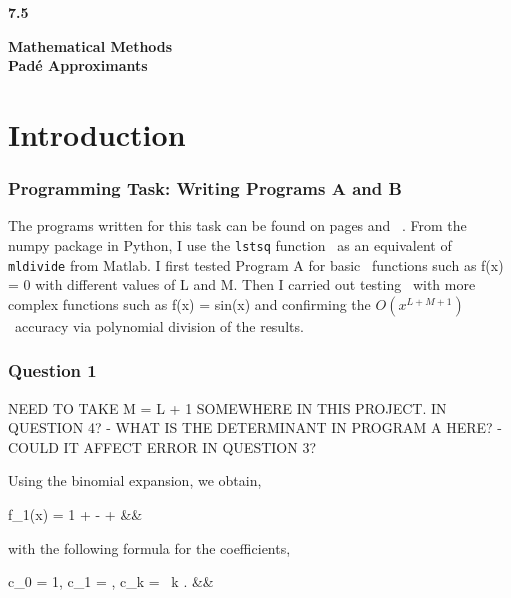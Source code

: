 \documentclass[12pt, a4paper]{article}
\begin{document}
	
	\setlength{\parindent}{0pt}
	\captionsetup{justification=centering}
	\lstset{
		showstringspaces=false
	}
	
	
	\begin{titlepage}
		\LARGE
		\textbf{7.5}
		\begin{center}
			\vspace*{7cm}
			
			\LARGE
			\textbf{Mathematical Methods}
			\\
			\vspace{1cm}
			\textbf{Pad\'e Approximants}
			
			\vspace{0.5cm}
		\end{center}
	\end{titlepage}

\section{Introduction}	
	
\subsubsection*{Programming Task: Writing Programs A and B}

The programs written for this task can be found on pages \pageref{Program_A} and \
\pageref{Program_B}. From the numpy package in Python, I use the \texttt{lstsq} function \
as an equivalent of \texttt{mldivide} from Matlab. I first tested Program A for basic \
functions such as f(x) = 0 with different values of L and M. Then I carried out testing \
with more complex functions such as f(x) = sin(x) and confirming the $O(x^{L+M+1})$ \
accuracy via polynomial division of the results.


\subsubsection*{Question 1}

NEED TO TAKE M = L + 1 SOMEWHERE IN THIS PROJECT. IN QUESTION 4? - WHAT IS THE DETERMINANT IN PROGRAM A HERE?
- COULD IT AFFECT ERROR IN QUESTION 3?

Using the binomial expansion, we obtain,
\begin{flalign*}
	f_{1}(x) = 1 + \frac{x}{2} - \frac{x^{2}}{8} + \frac{x^{3}}{16} &&
\end{flalign*}
with the following formula for the coefficients,
\begin{flalign*}
	c_{0} = 1, \quad c_{1} = , \quad c_{k} =   \ 
	k . &&
\end{flalign*}
\end{document}

